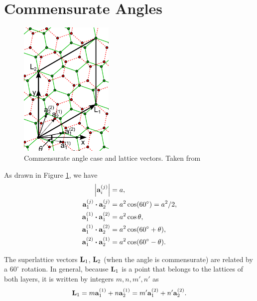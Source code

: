 \section{Commensurate Angles}

\begin{figure}[H]
\centering
\includegraphics[width=0.4\textwidth]{fig/latvec.png}
\caption{Commensurate angle case and lattice vectors. Taken from \cite{koshino2012}}
\label{fig:latvec}
\end{figure}

As drawn in Figure \ref{fig:latvec}, we have
\begin{align}
\label{eq:scalarprods0}
\abs{\a_i^{(j)}} &= a, \\
\label{eq:scalarprods1}
\vb{a}_1^{(j)} \vdot \vb{a}_2^{(j)} &= a^2 \cos(60^\circ) = a^2/2, \\
\label{eq:scalarprods2}
\vb{a}_1^{(1)} \vdot \vb{a}_1^{(2)} &= a^2 \cos\theta, \\
\label{eq:scalarprods3}
\vb{a}_1^{(1)} \vdot \vb{a}_2^{(2)} &= a^2 \cos(60^\circ + \theta), \\
\label{eq:scalarprods4}
\vb{a}_1^{(2)} \vdot \vb{a}_2^{(1)} &= a^2 \cos(60^\circ - \theta).
\end{align}

The superlattice vectors $\vb{L}_1$, $\vb{L}_2$ (when the angle is commensurate) are related by a $60^\circ$ rotation. In general, because $\vb{L}_1$ is a point that belongs to the lattices of both layers, it is written by integers $m,n,m',n'$ as
\begin{equation} \label{eq:L1}
\vb{L}_1 = m\vb{a}_1^{(1)} + n\vb{a}_2^{(1)} = m'\vb{a}_1^{(2)} + n'\vb{a}_2^{(2)}.
\end{equation}

